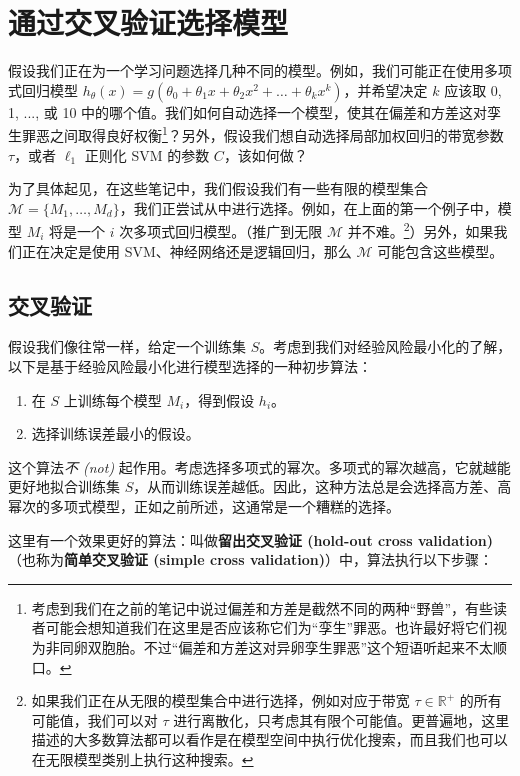 \section{通过交叉验证选择模型}\label{sec:9.3}

假设我们正在为一个学习问题选择几种不同的模型。例如，我们可能正在使用多项式回归模型 $h_\theta(x) = g(\theta_0 + \theta_1 x + \theta_2 x^2 + \dots + \theta_k x^k)$，并希望决定 $k$ 应该取 0, 1, ..., 或 10 中的哪个值。我们如何自动选择一个模型，使其在偏差和方差这对孪生罪恶之间取得良好权衡\footnote{考虑到我们在之前的笔记中说过偏差和方差是截然不同的两种“野兽”，有些读者可能会想知道我们在这里是否应该称它们为“孪生”罪恶。也许最好将它们视为非同卵双胞胎。不过“偏差和方差这对异卵孪生罪恶”这个短语听起来不太顺口。}？另外，假设我们想自动选择局部加权回归的带宽参数 $\tau$，或者 $\ell_1$ 正则化 SVM 的参数 $C$，该如何做？

为了具体起见，在这些笔记中，我们假设我们有一些有限的模型集合 $\mathcal{M} = \{M_1, \dots, M_d\}$，我们正尝试从中进行选择。例如，在上面的第一个例子中，模型 $M_i$ 将是一个 $i$ 次多项式回归模型。（推广到无限 $\mathcal{M}$ 并不难。\footnote{如果我们正在从无限的模型集合中进行选择，例如对应于带宽 $\tau \in \mathbb{R}^+$ 的所有可能值，我们可以对 $\tau$ 进行离散化，只考虑其有限个可能值。更普遍地，这里描述的大多数算法都可以看作是在模型空间中执行优化搜索，而且我们也可以在无限模型类别上执行这种搜索。}）另外，如果我们正在决定是使用 SVM、神经网络还是逻辑回归，那么 $\mathcal{M}$ 可能包含这些模型。

\subsection*{交叉验证}

假设我们像往常一样，给定一个训练集 $S$。考虑到我们对经验风险最小化的了解，以下是基于经验风险最小化进行模型选择的一种初步算法：

\begin{enumerate}
    \item 在 $S$ 上训练每个模型 $M_i$，得到假设 $h_i$。
    \item 选择训练误差最小的假设。
\end{enumerate}

这个算法\textit{不 (not)} 起作用。考虑选择多项式的幂次。多项式的幂次越高，它就越能更好地拟合训练集 $S$，从而训练误差越低。因此，这种方法总是会选择高方差、高幂次的多项式模型，正如之前所述，这通常是一个糟糕的选择。

这里有一个效果更好的算法：叫做\textbf{留出交叉验证 (hold-out cross validation)}（也称为\textbf{简单交叉验证 (simple cross validation)}）中，算法执行以下步骤：

